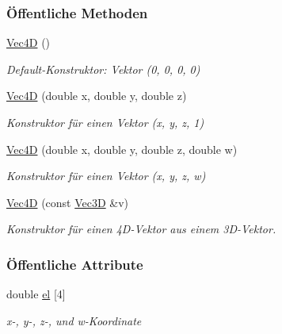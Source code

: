 \subsubsection*{Öffentliche Methoden}
\begin{DoxyCompactItemize}
\item 
\mbox{\hyperlink{classVec4D_afef8dcc77fa1c7791adcc7f5624fb52a}{Vec4D}} ()
\begin{DoxyCompactList}\small\item\em Default-\/\+Konstruktor\+: Vektor (0, 0, 0, 0) \end{DoxyCompactList}\item 
\mbox{\hyperlink{classVec4D_ab8662f7cf26c846e19009afb03b81424}{Vec4D}} (double x, double y, double z)
\begin{DoxyCompactList}\small\item\em Konstruktor für einen Vektor ({\ttfamily x}, {\ttfamily y}, {\ttfamily z}, 1) \end{DoxyCompactList}\item 
\mbox{\hyperlink{classVec4D_abfc701094837431b1d995f600cfb8c6d}{Vec4D}} (double x, double y, double z, double w)
\begin{DoxyCompactList}\small\item\em Konstruktor für einen Vektor ({\ttfamily x}, {\ttfamily y}, {\ttfamily z}, {\ttfamily w}) \end{DoxyCompactList}\item 
\mbox{\hyperlink{classVec4D_a603ea8a3195095b0c1f4286ae6d93f45}{Vec4D}} (const \mbox{\hyperlink{classVec3D}{Vec3D}} \&v)
\begin{DoxyCompactList}\small\item\em Konstruktor für einen 4\+D-\/\+Vektor aus einem 3\+D-\/\+Vektor. \end{DoxyCompactList}\end{DoxyCompactItemize}
\subsubsection*{Öffentliche Attribute}
\begin{DoxyCompactItemize}
\item 
double \mbox{\hyperlink{classVec4D_a8e0e1401fd89d0868dd3aa7c1000198a}{el}} \mbox{[}4\mbox{]}
\begin{DoxyCompactList}\small\item\em x-\/, y-\/, z-\/, und w-\/\+Koordinate \end{DoxyCompactList}\end{DoxyCompactItemize}


